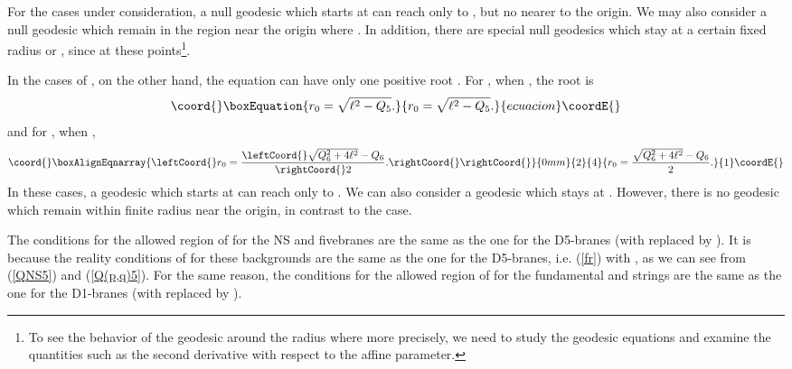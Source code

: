 \documentclass[a4paper,12pt]{article}
\begin{document}
For the cases under consideration, a null geodesic  
which starts at \coordHE{} can reach only to \coordHE{}, 
but no nearer to the origin.
We may also consider a null geodesic which remain 
in the region near the origin \coordHE{}
where \coordHE{}.
In addition, there are special null geodesics which stay
at a certain fixed radius \coordHE{} or \coordHE{},
since \coordHE{}  at these points\footnote{%
To see the behavior of the geodesic around
the radius where \coordHE{} more precisely, we need to
study the geodesic equations and examine the quantities 
such as the second derivative with respect to the affine 
parameter.}.

In the cases of \coordHE{},
on the other hand, the equation \coordHE{} can have only
one positive root \coordHE{}. For \coordHE{}, when \coordHE{},
the root is  
\begin{equation}\coord{}\boxEquation{
r_0=\sqrt{\ell^2-Q_5}.
}{
r_0=\sqrt{\ell^2-Q_5}.
}{ecuacion}\coordE{}\end{equation}
and for \coordHE{}, when \coordHE{},
\begin{eqnarray}\coord{}\boxAlignEqnarray{\leftCoord{}
r_{0}=\frac{\leftCoord{}\sqrt{Q_6^2+4\ell^2}-Q_6}{\rightCoord{}2}.\rightCoord{}
\rightCoord{}}{0mm}{2}{4}{
r_{0}=\frac{\sqrt{Q_6^2+4\ell^2}-Q_6}{2}.
}{1}\coordE{}\end{eqnarray}
In these cases,
a geodesic which starts at \coordHE{} can reach
only to \coordHE{}. We can also consider a geodesic which
stays at \coordHE{}. However, there is no geodesic which
remain within finite radius near the origin, in contrast
to the \coordHE{} case. 

The conditions for the allowed region of \coordHE{} for
the NS and \coordHE{} fivebranes are the same as 
the one for the D5-branes (with \coordHE{} replaced
by \coordHE{}). It is because the reality conditions
of \coordHE{} for these backgrounds
are the same as the one for the D5-branes,
i.e. (\ref{fr}) with \coordHE{}, as we can see from 
(\ref{QNS5}) and (\ref{Q(p,q)5}).
For the same reason, the conditions for the allowed
region of \coordHE{} for the fundamental and \coordHE{} strings
are the same as the one for the D1-branes (with
\coordHE{} replaced by \coordHE{}).
\end{document}
